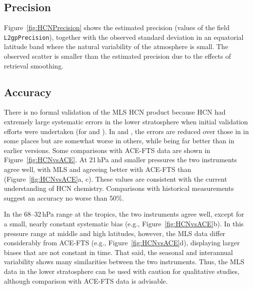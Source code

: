 \subsection{Precision}

Figure~\ref{fig:HCNPrecision} shows the estimated precision (values of the field \texttt{L2gpPrecision}), together with the observed standard deviation in an equatorial latitude band where the natural variability of the atmosphere is small. The observed scatter is smaller than the estimated precision due to the effects of retrieval smoothing.


\subsection{Accuracy}

There is no formal validation of the MLS HCN product because HCN had extremely large systematic errors in the lower stratosphere when initial validation efforts were undertaken (for \vii and \viii). In \prevv and \thisv, the errors are reduced over those in \viv in some places but are somewhat worse in others, while being far better than in earlier versions. Some comparisons with ACE-FTS data are shown in Figure~\ref{fig:HCNvsACE}. At 21\,hPa and smaller pressures the two instruments agree well, with MLS \prevv and \thisv agreeing better with ACE-FTS than \viv (Figure~\ref{fig:HCNvsACE}a, c). These values are consistent with the current understanding of HCN chemistry. 
Comparisons with historical measurements suggest an accuracy no worse than 50\%.

In the 68--32\,hPa range at the tropics, the two instruments agree well, except for a small, nearly constant systematic bias (e.g., Figure~\ref{fig:HCNvsACE}b). In this pressure range at middle and high latitudes, however, the MLS data differ considerably from \mbox{ACE-FTS} (e.g., Figure~\ref{fig:HCNvsACE}d), displaying larger biases that are not constant in time.  That said, the seasonal and interannual variability shows many similarities between the two instruments. Thus, the MLS data in the lower stratosphere can be used with caution for qualitative studies, although comparison with \mbox{ACE-FTS} data is advisable.

